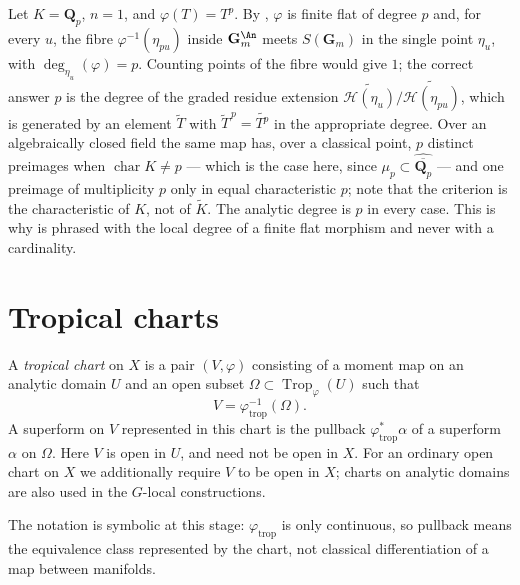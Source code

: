 \begin{example}
\label{ex:trop-fibre-counting}
Let $K=\mathbf Q_p$, $n=1$, and $\varphi(T)=T^p$. By
, $\varphi$ is finite flat of degree $p$
and, for every $u$, the fibre $\varphi^{-1}(\eta_{pu})$ inside
$\mathbf G_m^{\An}$ meets $S(\mathbf G_m)$ in the single point $\eta_u$,
with $\deg_{\eta_u}(\varphi)=p$. Counting points of the fibre would give
$1$; the correct answer $p$ is the degree of the graded residue extension
$\widetilde{\mathcal H(\eta_u)}/\widetilde{\mathcal H(\eta_{pu})}$, which is
generated by an element $\widetilde{T}$ with
$\widetilde T^{\,p}=\widetilde{T^p}$ in the appropriate degree. Over an
algebraically closed field the same map has, over a classical point,
$p$ distinct preimages when $\operatorname{char}K\ne p$ --- which is the case
here, since $\mu_p\subset\widehat{\overline{\mathbf Q_p}}$ --- and one
preimage of multiplicity $p$ only in equal characteristic $p$; note that the
criterion is the characteristic of $K$, not of $\widetilde K$.  The analytic
degree is $p$ in every case. This is why  is phrased with the
local degree of a finite flat morphism and never with a cardinality.
\end{example}

\section{Tropical charts}
\label{sec:trop-charts}

\begin{definition}
\label{def:trop-chart}
A \emph{tropical chart} on $X$ is a pair $(V,\varphi)$ consisting of a moment
map on an analytic domain $U$ and an open subset
$\Omega\subset\operatorname{Trop}_\varphi(U)$ such that
\[
                         V=\varphi_{\mathrm{trop}}^{-1}(\Omega).
\]
A superform on $V$ represented in this chart is the pullback
$\varphi_{\mathrm{trop}}^*\alpha$ of a superform $\alpha$ on $\Omega$.
Here $V$ is open in $U$, and need not be open in $X$. For an ordinary open
chart on $X$ we additionally require $V$ to be open in $X$; charts on
analytic domains are also used in the $G$-local constructions.
\end{definition}

The notation is symbolic at this stage: $\varphi_{\mathrm{trop}}$ is only
continuous, so pullback means the equivalence class represented by the chart,
not classical differentiation of a map between manifolds.

